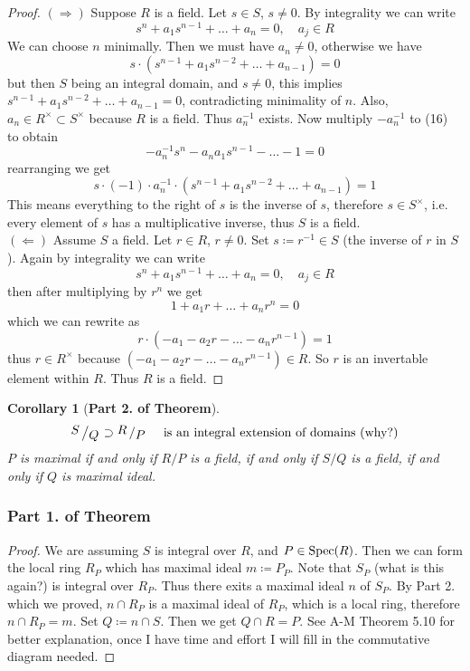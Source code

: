\documentclass[12pt]{article}
\newcommand{\spec}{\textup{Spec}}
\newcommand{\bigslant}[2]{{\raisebox{.2em}{$#1$}\left/\raisebox{-.2em}{$#2$}\right.}}
\newtheorem{corollary}[theorem]{Corollary}
\theoremstyle{definition}
\begin{document}
\begin{proof}
$(\Rightarrow)$ Suppose $R$ is a field. Let $s\in S$, $s\neq 0$. By integrality we can write
\begin{equation}
s^n+a_1s^{n-1}+\dots+a_n = 0,\quad a_j\in R    
\end{equation}
We can choose $n$ minimally. Then we must have $a_n\neq 0$, otherwise we have 
\[
s\cdot (s^{n-1}+a_1s^{n-2}+\dots +a_{n-1}) =0
\]
but then $S$ being an integral domain, and $s\neq 0$, this implies $s^{n-1}+a_1s^{n-2}+\dots +a_{n-1} =0$, contradicting minimality of $n$. Also, $a_n \in R^\times \subset S^\times$ because $R$ is a field. Thus $a_n^{-1}$ exists. Now multiply $-a_n^{-1}$ to (16) to obtain
\[
-a_n^{-1}s^n-a_na_1s^{n-1}-\dots - 1=0
\]
rearranging we get
\[
s\cdot (-1)\cdot a_n^{-1}\cdot (s^{n-1}+a_1s^{n-2}+\dots + a_{n-1}) = 1
\]
This means everything to the right of $s$ is the inverse of $s$, therefore $s\in S^\times$, i.e. every element of $s$ has a multiplicative inverse, thus $S$ is a field.\\
$(\Leftarrow)$ Assume $S$ a field. Let $r\in R$, $r\neq 0$. Set $s\coloneqq r^{-1} \in S$ (the inverse of $r$ in $S$). Again by integrality we can write
\[
s^n+a_1s^{n-1}+\dots+a_n = 0,\quad a_j\in R
\]
then after multiplying by $r^n$ we get
\[
1+a_1r + \dots + a_nr^n =0
\]
which we can rewrite as
\[
r\cdot (-a_1-a_2r-\dots -a_nr^{n-1}) =1
\]
thus $r\in R^\times$ because $(-a_1-a_2r-\dots -a_nr^{n-1})\in R$. So $r$ is an invertable element within $R$. Thus $R$ is a field.
\end{proof}
\begin{corollary}[\textbf{Part 2. of Theorem}]
\[
\bigslant{S}{Q} \supset \bigslant{R}{P}\quad \text{ is an integral extension of domains (why?)}
\]
$P$ is maximal if and only if $R/P$ is a field, if and only if $S/Q$ is a field, if and only if $Q$ is maximal ideal.
\end{corollary}
\subsubsection*{Part 1. of Theorem}
\begin{proof}
We are assuming $S$ is integral over $R$, and $P\in \spec(R)$. Then we can form the local ring $R_P$ which has maximal ideal $m\coloneqq P_P$. Note that $S_P$ (what is this again?) is integral over $R_P$. Thus there exits a maximal ideal $n$ of $S_P$. By Part 2. which we proved, $n\cap R_P$ is a maximal ideal of $R_P$, which is a local ring, therefore $n\cap R_P = m$. Set $Q \coloneqq n\cap S$. Then we get $Q\cap R = P$. See A-M Theorem 5.10 for better explanation, once I have time and effort I will fill in the commutative diagram needed.
\end{proof}
\end{document}
